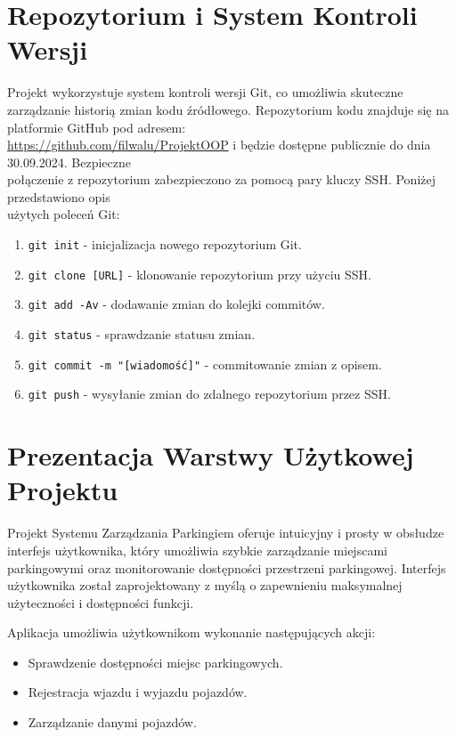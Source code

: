 \documentclass{article}
\begin{document}
\section{Repozytorium i System Kontroli Wersji}

Projekt wykorzystuje system kontroli wersji Git, co umożliwia skuteczne zarządzanie historią zmian kodu źródłowego. Repozytorium kodu znajduje się na platformie GitHub pod adresem:\\ \url{https://github.com/filwalu/ProjektOOP} i będzie dostępne publicznie do dnia 30.09.2024. Bezpieczne\\ połączenie z repozytorium zabezpieczono za pomocą pary kluczy SSH. Poniżej przedstawiono opis\\ użytych poleceń Git:

\begin{enumerate}
    \item \texttt{git init} - inicjalizacja nowego repozytorium Git.
    \item \texttt{git clone [URL]} - klonowanie repozytorium przy użyciu SSH.
    \item \texttt{git add -Av} - dodawanie zmian do kolejki commitów.
    \item \texttt{git status} - sprawdzanie statusu zmian.
    \item \texttt{git commit -m "[wiadomość]"} - commitowanie zmian z opisem.
    \item \texttt{git push} - wysyłanie zmian do zdalnego repozytorium przez SSH.
\end{enumerate}

\section{Prezentacja Warstwy Użytkowej Projektu}

Projekt Systemu Zarządzania Parkingiem oferuje intuicyjny i prosty w obsłudze interfejs użytkownika, który umożliwia szybkie zarządzanie miejscami parkingowymi oraz monitorowanie dostępności przestrzeni parkingowej. Interfejs użytkownika został zaprojektowany z myślą o zapewnieniu maksymalnej użyteczności i dostępności funkcji.

Aplikacja umożliwia użytkownikom wykonanie następujących akcji:
\begin{itemize}
    \item Sprawdzenie dostępności miejsc parkingowych.
    \item Rejestracja wjazdu i wyjazdu pojazdów.
    \item Zarządzanie danymi pojazdów.
\end{itemize}
\end{document}

